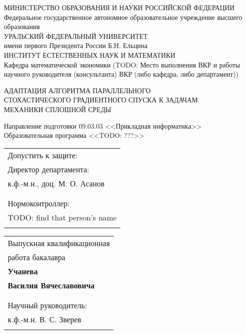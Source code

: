 \documentclass[12pt]{report}
\begin{document}
  \pagestyle{empty} %
  \begin{center}
    \small
    МИНИСТЕРСТВО ОБРАЗОВАНИЯ И НАУКИ РОССИЙСКОЙ ФЕДЕРАЦИИ\\
    Федеральное государственное автономное образовательное учреждение высшего образования\\
    УРАЛЬСКИЙ ФЕДЕРАЛЬНЫЙ УНИВЕРСИТЕТ \\
    имени первого Президента России Б.Н. Ельцина\\
    \vspace{1em}
    ИНСТИТУТ ЕСТЕСТВЕННЫХ НАУК И МАТЕМАТИКИ\\
    Кафедра математической экономики (TODO: Место выполнения ВКР и работы научного руководителя (консультанта) ВКР (либо кафедра, либо департамент))
  \end{center}

  \vspace{1em}

  \begin{center}
    \large
    АДАПТАЦИЯ АЛГОРИТМА ПАРАЛЛЕЛЬНОГО\\ СТОХАСТИЧЕСКОГО ГРАДИЕНТНОГО СПУСКА К ЗАДАЧАМ\\ МЕХАНИКИ СПЛОШНОЙ СРЕДЫ
    \vspace{1em}

    \normalsize
    Направление подготовки 09.03.03 <<Прикладная информатика>>\\
    \vspace{1em}
    Образовательная программа <<TODO: ???>>
    \end{center}
  \vspace{1em}

  \begin{tabular}[t]{@{}l}
    Допустить к защите:\\
    Директор департамента:\\ к.ф.-м.н., доц. М. О. Асанов\\
    \underline{\hspace{5cm}}\\
    \vspace{1em}\\
    Нормоконтроллер:\\ {TODO: find that person's name}\\
    \underline{\hspace{5cm}}
  \end{tabular}
  \hfill
  \begin{tabular}[t]{l@{}}
      Выпускная квалификационная\\работа бакалавра\\
      \textbf{Учанева}\\
      \textbf{Василия Вячеславовича}\\
      \underline{\hspace{5cm}}\\
      \vspace{1em}\\
      Научный руководитель:\\ к.ф.-м.н. В. С. Зверев\\
      \underline{\hspace{5cm}}\\
  \end{tabular}
\end{document}
